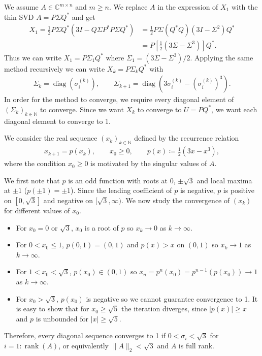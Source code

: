\documentclass[10pt, A4paper]{article}
\newcommand{\mxn}{m \times n}
\DeclareMathOperator{\diag}{diag}
\DeclareMathOperator{\rank}{rank}
\begin{document}
We assume $A \in \mathbb{C}^{\mxn}$ and $m\geq n$. We replace $A$ in 
the expression of $X_1$ with the thin SVD $A = P \Sigma Q^*$ and get
\begin{align}
	X_1 = \frac{1}{2}P \Sigma Q^*(3I - Q\Sigma P^* P \Sigma Q^*)
	   &= \frac{1}{2} P \Sigma (Q^* Q) (3I - \Sigma^2) Q^* \\
	   &= P \left[ \frac{1}{2} (3\Sigma - \Sigma^3) \right] Q^*.
\end{align}
Thus we can write $X_1 = P \Sigma_1 Q^*$ where $\Sigma_1 = (3\Sigma - 
\Sigma^3)/2$.
Applying the same method recursively we can write $X_k = P\Sigma_k Q^*$ 
with
\begin{align}
\Sigma_k = \diag(\sigma_i^{(k)}), \qquad \Sigma_{k+1} = \diag
(3\sigma_i^{(k)} - (\sigma_i^{(k)})^3).
\end{align}
In order for the method to converge, we require every diagonal element 
of $(\Sigma_k)_{k\in\mathbb{N}}$ to converge. Since we want $X_k$ to 
converge to $U = PQ^*$, we want each diagonal element to converge to 1. 

We consider the real sequence $(x_k)_{k \in \mathbb{N}}$ defined by the 
recurrence relation
\begin{align}
	x_{k+1} = p(x_k), \qquad x_0 \geq 0, \qquad p(x) \coloneqq 
	\frac{1}{2} (3x - x^3),
\end{align}
where the condition $x_0 \geq 0$ is motivated by the singular values of 
$A$.

We first note that $p$ is an odd function with roots at 0, $\pm\sqrt{3}$
and local maxima at $\pm1$ ($p(\pm1) = \pm1$).
Since the leading coefficient of $p$ is negative, $p$ is positive on 
$[0,\sqrt{3}]$ and negative on $[\sqrt{3}, \infty)$. We now study the 
convergence of $(x_k)$ for different values of $x_0$.
\begin{itemize}
	\item For $x_0 = 0$ or $\sqrt{3}$, $x_0$ is a root of $p$ so $x_k 
	\to 0$ as $k \to \infty$.
	\item For $0 < x_0 \leq 1$, $p(0,1) = (0, 1)$ and $p(x) > x$  on 
	$(0, 1)$ so $x_k \to 1$ as $k \to \infty$.
	\item For $1 < x_0 < \sqrt{3}$, $p(x_0) \in (0,1)$ so $x_n = 
	p^n(x_0) = p^{n-1}(p(x_0)) \to 1$ as $k \to \infty$.
	\item For $x_0 > \sqrt{3}$, $p(x_0)$ is negative so we cannot 
	guarantee convergence to 1. It is easy to show that for $x_0 \geq 
	\sqrt{5}$ the iteration diverges, since $|p(x)| \geq x$ and $p$ is 
	unbounded for $|x| \geq \sqrt{5}$.
\end{itemize}
Therefore, every diagonal sequence converges to 1 if $0 < \sigma_i < 
\sqrt{3}$ for $i = 1:\rank(A)$, or equivalently $\|A\|_2 < \sqrt{3}$ 
and $A$ is full rank.
\end{document}
